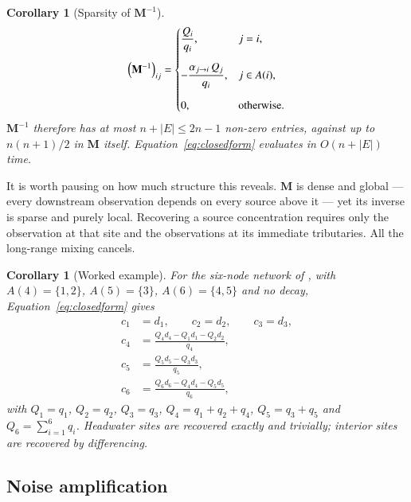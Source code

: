 \documentclass[11pt]{article}
\newcommand{\Mmat}{\ensuremath{\mathbf{M}}\xspace}
\newtheorem{corollary}[theorem]{Corollary}
\theoremstyle{definition}
\begin{document}
\begin{corollary}[Sparsity of $\Mmat^{-1}$]
\begin{equation}
  \left(\Mmat^{-1}\right)_{ij} =
  \begin{dcases}
    \dfrac{Q_i}{q_i}, & j = i, \\[6pt]
    -\dfrac{\alpha_{j \to i}\, Q_j}{q_i}, & j \in A(i), \\[6pt]
    0, & \text{otherwise.}
  \end{dcases}
  \label{eq:Minv}
\end{equation}
$\Mmat^{-1}$ therefore has at most $n + |E| \le 2n - 1$ non-zero entries, against up to
$n(n+1)/2$ in $\Mmat$ itself. Equation~\eqref{eq:closedform} evaluates in $O(n + |E|)$ time.
\end{corollary}

\noindent It is worth pausing on how much structure this reveals. $\Mmat$ is dense and global
--- every downstream observation depends on every source above it --- yet its inverse is
sparse and purely local. Recovering a source concentration requires only the observation at
that site and the observations at its immediate tributaries. All the long-range mixing cancels.

\begin{corollary}[Worked example]
For the six-node network of \textcite[Figure~2]{barnes_using_2024}, with $A(4) = \{1,2\}$,
$A(5) = \{3\}$, $A(6) = \{4,5\}$ and no decay, Equation~\eqref{eq:closedform} gives
\begin{align*}
  c_1 &= d_1, \qquad c_2 = d_2, \qquad c_3 = d_3, \\
  c_4 &= \frac{Q_4 d_4 - Q_1 d_1 - Q_2 d_2}{q_4}, \\
  c_5 &= \frac{Q_5 d_5 - Q_3 d_3}{q_5}, \\
  c_6 &= \frac{Q_6 d_6 - Q_4 d_4 - Q_5 d_5}{q_6},
\end{align*}
with $Q_1 = q_1$, $Q_2 = q_2$, $Q_3 = q_3$, $Q_4 = q_1 + q_2 + q_4$, $Q_5 = q_3 + q_5$ and
$Q_6 = \sum_{i=1}^{6} q_i$. Headwater sites are recovered exactly and trivially; interior sites
are recovered by differencing.
\end{corollary}

\subsection{Noise amplification}
\label{sec:amplification}
\end{document}
